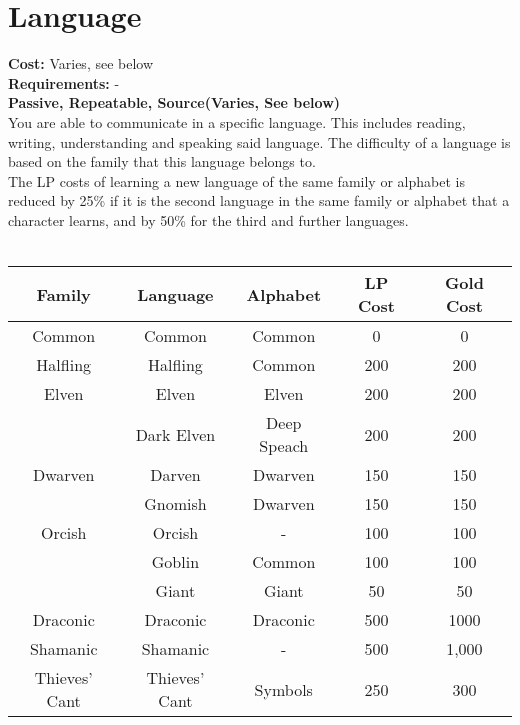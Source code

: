 \section{Language}\label{sec:language}
\textbf{Cost:} Varies, see below\\
\textbf{Requirements:} -\\
\textbf{Passive, Repeatable, Source(Varies, See below)}\\
You are able to communicate in a specific language.
This includes reading, writing, understanding and speaking said language.
The difficulty of a language is based on the family that this language belongs to.\\
The LP costs of learning a new language of the same family or alphabet is reduced by 25\% if it is the second language in the same family or alphabet that a character learns, and by 50\% for the third and further languages.\\
\\

\begin{longtable}{c | c | c | c | c}
	Family & Language & Alphabet & LP Cost & Gold Cost\\
	\hline
	Common & Common & Common & 0 & 0\\
	\cline{2-5}
	Halfling & Halfling & Common & 200 & 200\\
	Elven & Elven & Elven & 200 & 200\\
	& Dark Elven & Deep Speach & 200 & 200\\
	Dwarven & Darven & Dwarven & 150 & 150\\
	& Gnomish & Dwarven & 150 & 150\\
	Orcish & Orcish & - & 100 & 100\\
	& Goblin & Common & 100 & 100\\
	& Giant & Giant & 50 & 50\\
	Draconic & Draconic & Draconic & 500 & 1000\\
	Shamanic & Shamanic & - & 500 & 1,000\\
	Thieves' Cant & Thieves' Cant & Symbols & 250 & 300\\
\end{longtable}